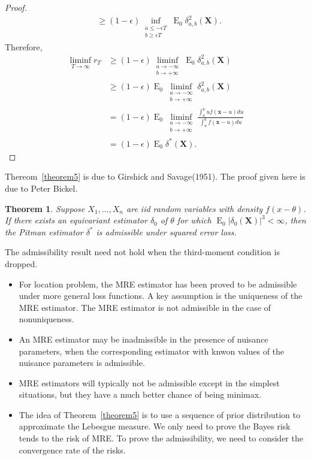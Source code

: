 \documentclass{article}
\DeclareMathOperator{\myE}{E}
\theoremstyle{plain}
\newtheorem{theorem}{Theorem}
\theoremstyle{definition}
\begin{document}
\begin{proof}
\begin{equation*}
\begin{aligned}
                &\geq
            (1-\epsilon)\inf_{\substack{ a\leq -\epsilon T\\b\geq \epsilon T}} \myE_0 \delta_{a,b}^2(\mathbf{X}).
            \end{aligned}
        \end{equation*}
        Therefore,
        \begin{equation*}
            \begin{aligned}
                \liminf_{T\to \infty} r_T &\geq
                (1-\epsilon)\liminf_{\substack{ a\to -\infty\\b\to +\infty}} \myE_0 \delta_{a,b}^2(\mathbf{X})\\
                &\geq
                (1-\epsilon)\myE_0 \liminf_{\substack{ a\to -\infty\\b\to +\infty}} \delta_{a,b}^2(\mathbf{X})\\
                &=(1-\epsilon)\myE_0 \liminf_{\substack{ a\to -\infty\\b\to +\infty}} \frac{\int_{a}^{b} u f(\mathbf{x}-u)du}{\int_{a}^{b} f(\mathbf{x}-u)du}\\
                &=(1-\epsilon)\myE_0   \delta^*(\mathbf{X}).
            \end{aligned}
        \end{equation*}

\end{proof}
Thereom~\ref{theorem5} is due to Girshick and Savage(1951). The proof given here is due to Peter Bickel.
\begin{theorem}
    Suppose $X_1,\ldots,X_n$ are iid random variables with density $f(x-\theta)$.
    If there exists an equivariant estimator $\delta_0$ of $\theta$ for which $\myE_0|\delta_0(\mathbf{X})|^3<\infty$, then the Pitman estimator $\delta^*$ is admissible under squared error loss.
\end{theorem}
The admissibility result need not hold when the third-moment condition is dropped.
\begin{itemize}
    \item
        For location problem, the MRE estimator has been proved to be admissible under more general loss functions.
        A key assumption is the uniqueness of the MRE estimator.
        The MRE estimator is not admissible in the case of nonuniqueness.
    \item
        An MRE estimator may be inadmissible in the presence of nuisance parameters, when the corresponding estimator with knwon values of the nuisance parameters is admissible.
    \item
        MRE estimators will typically not be admissible except in the simplest situations, but they have a much better chance of being minimax.
    \item 
        The idea of Theorem~\ref{theorem5} is to use a sequence of prior distribution to approximate the Lebesgue measure. We only need to prove the Bayes risk tends to the risk of MRE. To prove the admissibility, we need to consider the convergence rate of the risks.
\end{itemize}
\end{document}

